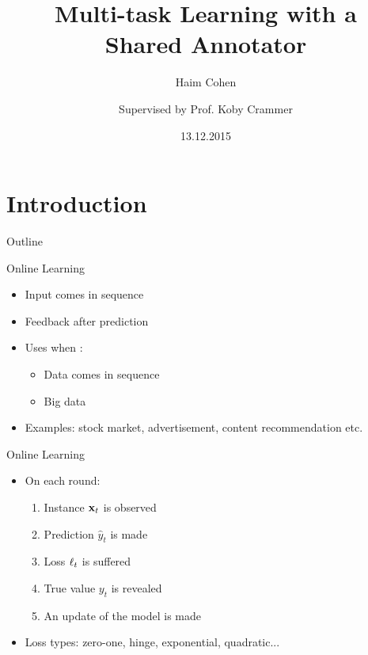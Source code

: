 \documentclass{beamer}
\title []{Multi-task Learning with a  \\Shared Annotator}    %
\author [H. Cohen and K. Crammer]{Haim Cohen \and \newline\newline  Supervised by Prof. Koby Crammer\newline\newline}
\institute [Technion]{Faculty of Electrical Engineering, Technion\\
Israel Institute of Technology}
\date[December 13th, 2015]{13.12.2015}
\begin{document}
\maketitle
\section{Introduction}

\begin{frame}{Outline}
  \tableofcontents[pausesections]
\end{frame}


\begin{frame}{Online Learning}
\begin{itemize}
\item Input  comes in sequence \newline
\item Feedback after prediction  \newline
\item   Uses when  : \newline
\begin{itemize}
\item Data comes in sequence \newline
\item Big data \newline
\end{itemize}
\item Examples: stock market, advertisement, content recommendation etc.\newline

\end{itemize}
\end{frame}


\begin{frame}{Online Learning}
\begin{itemize}
\item On each round:\newline
\begin{enumerate}
\item Instance $\mathbf{x}_{t}$ is observed\newline
\item Prediction $\hat{y}_t$ is made\newline
\item Loss $\ell_{t}$ is suffered\newline
\item True value $y_t$ is revealed\newline
\item An update of the model is made\newline
\end{enumerate}
\item Loss types: zero-one, hinge, exponential, quadratic...
\end{itemize}
\end{frame}
\end{document}
